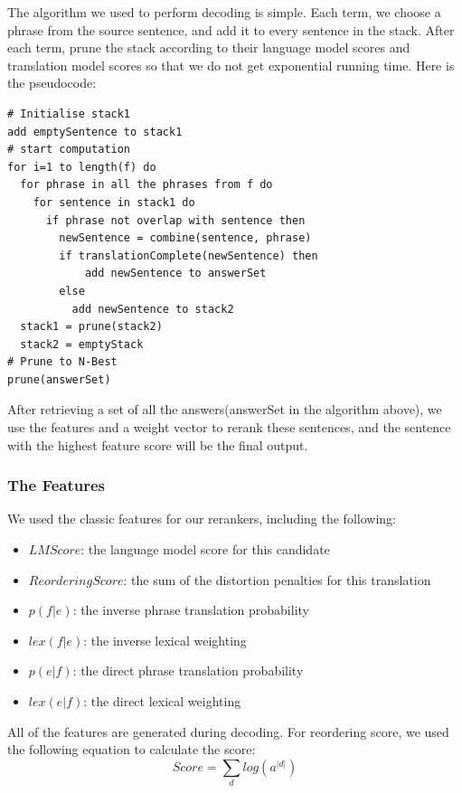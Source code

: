 \documentclass[11pt,letterpaper]{article}
\begin{document}
The algorithm we used to perform decoding is simple. Each term, we choose a phrase from the source sentence, and add it to every sentence in the stack. After each term, prune the stack according to their language model scores and translation model scores so that we do not get exponential running time. Here is the pseudocode:

\begin{lstlisting}
# Initialise stack1
add emptySentence to stack1
# start computation
for i=1 to length(f) do
  for phrase in all the phrases from f do
    for sentence in stack1 do
      if phrase not overlap with sentence then
        newSentence = combine(sentence, phrase)
        if translationComplete(newSentence) then
        	add newSentence to answerSet
        else
          add newSentence to stack2
  stack1 = prune(stack2)
  stack2 = emptyStack
# Prune to N-Best
prune(answerSet)
\end{lstlisting}

After retrieving a set of all the answers(answerSet in the algorithm above), we use the features and a weight vector to rerank these sentences, and the sentence with the highest feature score will be the final output.



\subsubsection{The Features}

We used the classic features for our rerankers, including the following:

\begin{itemize}
\itemsep0em 
\item $LMScore$: the language model score for this candidate
\item $ReorderingScore$: the sum of the distortion penalties for this translation
\item $p(f|e)$: the inverse phrase translation probability
\item $lex(f|e)$: the inverse lexical weighting
\item $p(e|f)$: the direct phrase translation probability
\item $lex(e|f)$: the direct lexical weighting
\end{itemize}

All of the features are generated during decoding. For reordering score, we used the following equation to calculate the score:
$$Score=\sum_{d}log(a^{|d|})$$
\end{document}
